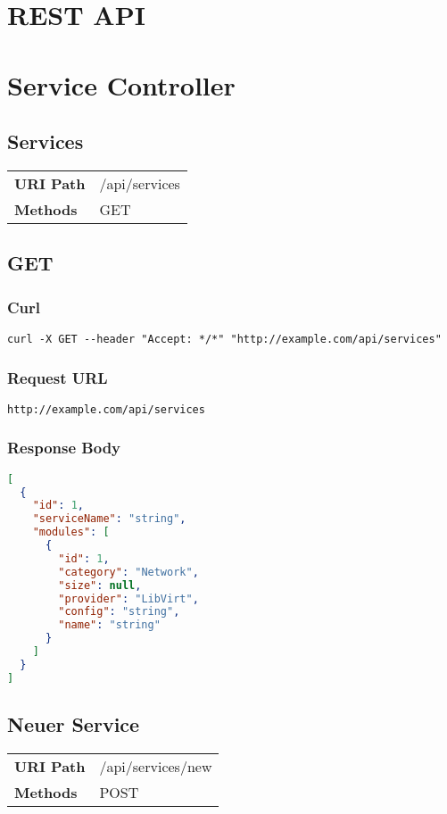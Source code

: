 \section{REST API}

\section{Service Controller}
\subsection{Services}
\begin{tabularx}{\linewidth}{l l}
\textbf{URI Path} & /api/services\\
\textbf{Methods} & GET\\
\end{tabularx}

\subsection{GET}
\subsubsection{Curl}
\begin{lstlisting}[style=Bash] 
curl -X GET --header "Accept: */*" "http://example.com/api/services"
\end{lstlisting}
\subsubsection{Request URL}
\begin{lstlisting}[] 
http://example.com/api/services
\end{lstlisting}
\subsubsection{Response Body}
\begin{lstlisting}[language=json] 
[
  {
    "id": 1,
    "serviceName": "string",
    "modules": [
      {
        "id": 1,
        "category": "Network",
        "size": null,
        "provider": "LibVirt",
        "config": "string",
        "name": "string"
      }
    ]
  }
]
\end{lstlisting}

\subsection{Neuer Service}
\begin{tabularx}{\linewidth}{l l}
\textbf{URI Path} & /api/services/new\\
\textbf{Methods} & POST\\
\end{tabularx}

